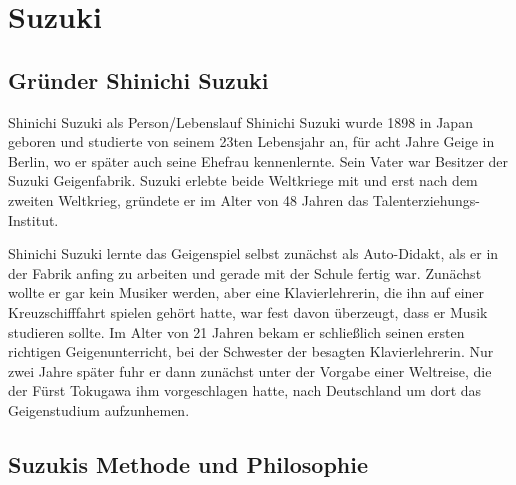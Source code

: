\section{Suzuki}

\subsection{Gründer Shinichi Suzuki} Shinichi Suzuki als Person/Lebenslauf
Shinichi Suzuki wurde 1898 in Japan geboren und studierte von seinem 23ten
Lebensjahr an, für acht Jahre Geige in Berlin, wo er später auch seine Ehefrau
kennenlernte. Sein Vater war Besitzer der Suzuki Geigenfabrik. Suzuki erlebte
beide Weltkriege mit und erst nach dem zweiten Weltkrieg, gründete er im Alter
von 48 Jahren das Talenterziehungs-Institut. 

Shinichi Suzuki lernte das Geigenspiel selbst zunächst als Auto-Didakt, als er
in der Fabrik anfing zu arbeiten und gerade mit der Schule fertig war. Zunächst
wollte er gar kein Musiker werden, aber eine Klavierlehrerin, die ihn auf einer
Kreuzschifffahrt spielen gehört hatte, war fest davon überzeugt, dass er Musik
studieren sollte. \autocite[89]{suzuki:erziehung_ist_liebe} Im Alter von 21
Jahren bekam er schließlich seinen ersten richtigen Geigenunterricht, bei der
Schwester der besagten Klavierlehrerin. Nur zwei Jahre später fuhr er dann
zunächst unter der Vorgabe einer Weltreise, die der Fürst Tokugawa ihm
vorgeschlagen hatte, nach Deutschland um dort das Geigenstudium aufzunhemen.
\autocite[90ff]{suzuki:erziehung_ist_liebe}

\subsection{Suzukis Methode und Philosophie}

